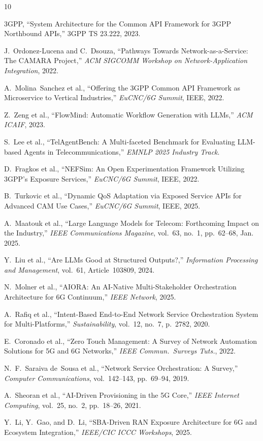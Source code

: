 \documentclass[conference]{IEEEtran}
\begin{document}
\begin{thebibliography}{10}

3GPP, ``System Architecture for the Common API Framework for 3GPP
Northbound APIs,'' 3GPP TS 23.222, 2023.

J.~Ordonez-Lucena and C.~Dsouza, ``Pathways Towards Network-as-a-Service:
The CAMARA Project,'' \emph{ACM SIGCOMM Workshop on Network-Application
Integration}, 2022.

A.~Molina~Sanchez et al., ``Offering the 3GPP Common API Framework as
Microservice to Vertical Industries,'' \emph{EuCNC/6G Summit}, IEEE, 2022.

Z.~Zeng et al., ``FlowMind: Automatic Workflow Generation with LLMs,''
\emph{ACM ICAIF}, 2023.

S.~Lee et al., ``TelAgentBench: A Multi-faceted Benchmark for Evaluating
LLM-based Agents in Telecommunications,'' \emph{EMNLP 2025 Industry Track}.

D.~Fragkos et al., ``NEFSim: An Open Experimentation Framework Utilizing
3GPP's Exposure Services,'' \emph{EuCNC/6G Summit}, IEEE, 2022.

B.~Turkovic et al., ``Dynamic QoS Adaptation via Exposed Service APIs for
Advanced CAM Use Cases,'' \emph{EuCNC/6G Summit}, IEEE, 2025.

A.~Maatouk et al., ``Large Language Models for Telecom: Forthcoming Impact
on the Industry,'' \emph{IEEE Communications Magazine}, vol.~63, no.~1,
pp.~62--68, Jan. 2025.

Y.~Liu et al., ``Are LLMs Good at Structured Outputs?,''
\emph{Information Processing and Management}, vol.~61, Article~103809, 2024.

N.~Molner et al., ``AIORA: An AI-Native Multi-Stakeholder Orchestration
Architecture for 6G Continuum,'' \emph{IEEE Network}, 2025.

A.~Rafiq et al., ``Intent-Based End-to-End Network Service Orchestration
System for Multi-Platforms,'' \emph{Sustainability}, vol.~12, no.~7,
p.~2782, 2020.

E.~Coronado et al., ``Zero Touch Management: A Survey of Network Automation
Solutions for 5G and 6G Networks,'' \emph{IEEE Commun.\ Surveys Tuts.},
2022.

N.~F.~Saraiva de~Sousa et al., ``Network Service Orchestration: A Survey,''
\emph{Computer Communications}, vol.~142--143, pp.~69--94, 2019.

A.~Sheoran et al., ``AI-Driven Provisioning in the 5G Core,''
\emph{IEEE Internet Computing}, vol.~25, no.~2, pp.~18--26, 2021.

Y.~Li, Y.~Gao, and D.~Li, ``SBA-Driven RAN Exposure Architecture for 6G
and Ecosystem Integration,'' \emph{IEEE/CIC ICCC Workshops}, 2025.

\end{thebibliography}
\end{document}
